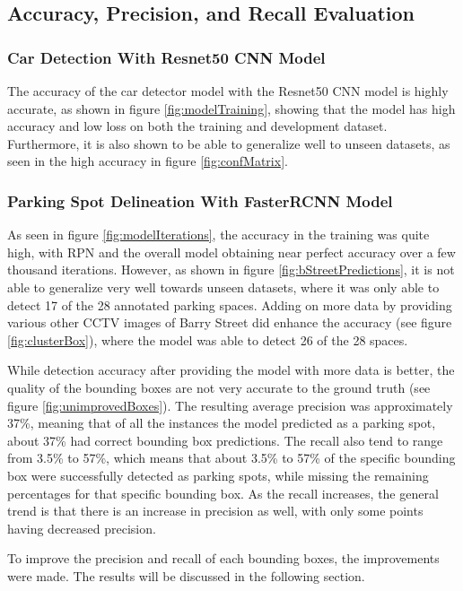 \documentclass[man]{apa7}
\begin{document}
\subsection{Accuracy, Precision, and Recall Evaluation}

\subsubsection{Car Detection With Resnet50 CNN Model}

The accuracy of the car detector model with the Resnet50 CNN model is highly accurate, as shown in figure \ref{fig:modelTraining}, showing that the model has high accuracy and low loss on both the training and development dataset. Furthermore, it is also shown to be able to generalize well to unseen datasets, as seen in the high accuracy in figure \ref{fig:confMatrix}.

\subsubsection{Parking Spot Delineation With FasterRCNN Model}

As seen in figure \ref{fig:modelIterations}, the accuracy in the training was quite high, with RPN and the overall model obtaining near perfect accuracy over a few thousand iterations. However, as shown in figure \ref{fig:bStreetPredictions}, it is not able to generalize very well towards unseen datasets, where it was only able to detect 17 of the 28 annotated parking spaces. Adding on more data by providing various other CCTV images of Barry Street did enhance the accuracy (see figure \ref{fig:clusterBox}), where the model was able to detect 26 of the 28 spaces.

While detection accuracy after providing the model with more data is better, the quality of the bounding boxes are not very accurate to the ground truth (see figure \ref{fig:unimprovedBoxes}). The resulting average precision was approximately 37\%, meaning that of all the instances the model predicted as a parking spot, about 37\% had correct bounding box predictions. The recall also tend to range from 3.5\% to 57\%, which means that about 3.5\% to 57\% of the specific bounding box were successfully detected as parking spots, while missing the remaining percentages for that specific bounding box. As the recall increases, the general trend is that there is an increase in precision as well, with only some points having decreased precision.

To improve the precision and recall of each bounding boxes, the improvements were made. The results will be discussed in the following section.
\end{document}
